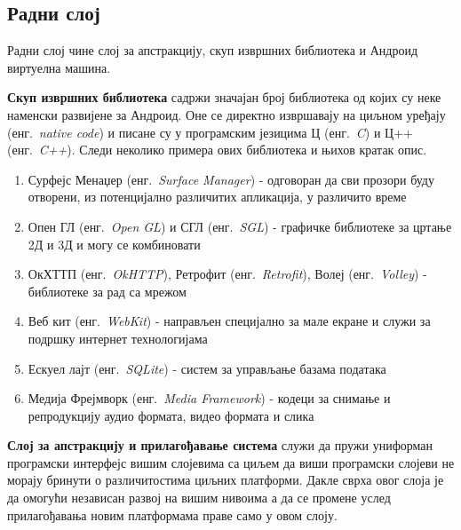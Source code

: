 \documentclass[12pt,oneside]{memoir}
\theoremstyle{remark}
\begin{document}
\subsection{Радни слој}
Радни слој чине слој за апстракцију, скуп извршних библиотека и Андроид виртуелна машина.

\textbf{Скуп извршних библиотека} садржи значајан број библиотека од којих су неке наменски развијене за Андроид. Оне се директно извршавају на циљном уређају (енг.~{\em native code}) и писане су у програмским језицима Ц (енг.~{\em C}) и Ц++ (енг.~{\em C++}).  Следи неколико примера ових библиотека и њихов кратак опис. \\
\begin{enumerate}
\item Сурфејс Менаџер  (енг.~{\em Surface Manager}) - одговоран да сви прозори буду отворени, из потенцијално различитих апликација, у различито време
\item Опен ГЛ  (енг.~{\em Open GL}) и СГЛ  (енг.~{\em SGL}) - графичке библиотеке за цртање 2Д и 3Д и могу се комбиновати 
\item ОкХТТП  (енг.~{\em OkHTTP}),  Ретрофит (енг.~{\em Retrofit}), Волеј  (енг.~{\em Volley}) - библиотеке за рад са мрежом
\item Веб кит (енг.~{\em WebKit}) - направљен специјално за мале екране и служи за подршку интернет технологијама
\item Ескуел лајт (енг.~{\em SQLite}) - систем за управљање базама података
\item Медија Фрејмворк (енг.~{\em Media Framework}) - кодеци за снимање и репродукцију аудио формата, видео формата и слика
\end{enumerate}


\textbf{Слој за апстракцију и прилагођавање система} служи да пружи униформан програмски интерфејс вишим слојевима са циљем да виши програмски слојеви не морају бринути о различитостима циљних платформи. Дакле сврха овог слоја је да омогући независан развој на вишим нивоима а да се промене услед прилагођавања новим платформама праве само у овом слоју.
\end{document}
